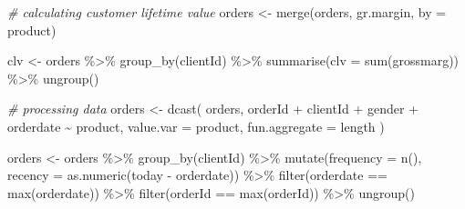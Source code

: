 \documentclass[
]{book}
\newenvironment{Shaded}{\begin{snugshade}}{\end{snugshade}}
\newcommand{\AttributeTok}[1]{\textcolor[rgb]{0.77,0.63,0.00}{#1}}
\newcommand{\CommentTok}[1]{\textcolor[rgb]{0.56,0.35,0.01}{\textit{#1}}}
\newcommand{\FunctionTok}[1]{\textcolor[rgb]{0.00,0.00,0.00}{#1}}
\newcommand{\NormalTok}[1]{#1}
\newcommand{\OtherTok}[1]{\textcolor[rgb]{0.56,0.35,0.01}{#1}}
\newcommand{\SpecialCharTok}[1]{\textcolor[rgb]{0.00,0.00,0.00}{#1}}
\newcommand{\StringTok}[1]{\textcolor[rgb]{0.31,0.60,0.02}{#1}}
\begin{document}
\begin{Shaded}
\begin{Highlighting}[]
\CommentTok{\# calculating customer lifetime value}
\NormalTok{orders }\OtherTok{\textless{}{-}} \FunctionTok{merge}\NormalTok{(orders, gr.margin, }\AttributeTok{by =} \StringTok{\textquotesingle{}product\textquotesingle{}}\NormalTok{)}

\NormalTok{clv }\OtherTok{\textless{}{-}}\NormalTok{ orders }\SpecialCharTok{\%\textgreater{}\%}
    \FunctionTok{group\_by}\NormalTok{(clientId) }\SpecialCharTok{\%\textgreater{}\%}
    \FunctionTok{summarise}\NormalTok{(}\AttributeTok{clv =} \FunctionTok{sum}\NormalTok{(grossmarg)) }\SpecialCharTok{\%\textgreater{}\%}
    \FunctionTok{ungroup}\NormalTok{()}

\CommentTok{\# processing data}
\NormalTok{orders }\OtherTok{\textless{}{-}}
    \FunctionTok{dcast}\NormalTok{(}
\NormalTok{        orders,}
\NormalTok{        orderId }\SpecialCharTok{+}\NormalTok{ clientId }\SpecialCharTok{+}\NormalTok{ gender }\SpecialCharTok{+}\NormalTok{ orderdate }\SpecialCharTok{\textasciitilde{}}\NormalTok{ product,}
        \AttributeTok{value.var =} \StringTok{\textquotesingle{}product\textquotesingle{}}\NormalTok{,}
        \AttributeTok{fun.aggregate =}\NormalTok{ length}
\NormalTok{    )}

\NormalTok{orders }\OtherTok{\textless{}{-}}\NormalTok{ orders }\SpecialCharTok{\%\textgreater{}\%}
    \FunctionTok{group\_by}\NormalTok{(clientId) }\SpecialCharTok{\%\textgreater{}\%}
    \FunctionTok{mutate}\NormalTok{(}\AttributeTok{frequency =} \FunctionTok{n}\NormalTok{(),}
           \AttributeTok{recency =} \FunctionTok{as.numeric}\NormalTok{(today }\SpecialCharTok{{-}}\NormalTok{ orderdate)) }\SpecialCharTok{\%\textgreater{}\%}
    \FunctionTok{filter}\NormalTok{(orderdate }\SpecialCharTok{==} \FunctionTok{max}\NormalTok{(orderdate)) }\SpecialCharTok{\%\textgreater{}\%}
    \FunctionTok{filter}\NormalTok{(orderId }\SpecialCharTok{==} \FunctionTok{max}\NormalTok{(orderId)) }\SpecialCharTok{\%\textgreater{}\%}
    \FunctionTok{ungroup}\NormalTok{()}


\end{Highlighting}
\end{Shaded}
\end{document}

